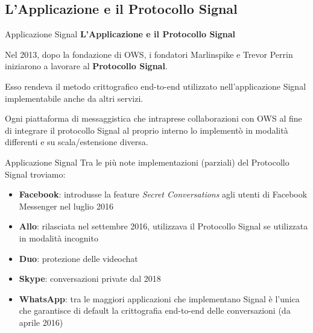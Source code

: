 \subsection{L'Applicazione e il Protocollo Signal}
\begin{frame}{Applicazione Signal}
    \textbf{L'Applicazione e il Protocollo Signal}
    \newline
    
    Nel 2013, dopo la fondazione di OWS, i fondatori Marlinspike e Trevor Perrin iniziarono a lavorare al \textbf{Protocollo Signal}.\newline
    
    Esso rendeva il metodo crittografico end-to-end utilizzato nell’applicazione Signal implementabile anche da altri servizi. \newline
    
    Ogni piattaforma di messaggistica che intraprese collaborazioni con OWS al fine di integrare il protocollo Signal al proprio interno lo implementò in modalità differenti e su scala/estensione diversa.

\end{frame}

\begin{frame}{Applicazione Signal}
    Tra le più note implementazioni (parziali) del Protocollo Signal troviamo:
    \begin{itemize}
        \item \textbf{Facebook}: introdusse la feature \textit{Secret Conversations} agli utenti di Facebook Messenger nel luglio 2016
        \item \textbf{Allo}: rilasciata nel settembre 2016, utilizzava il Protocollo Signal se utilizzata in modalità incognito
        \item \textbf{Duo}: protezione delle videochat
        \item \textbf{Skype}: conversazioni private dal 2018
        \item \textbf{WhatsApp}: tra le maggiori applicazioni che implementano Signal è l’unica che garantisce di default la crittografia end-to-end delle conversazioni (da aprile 2016)
    \end{itemize}
    
\end{frame}


